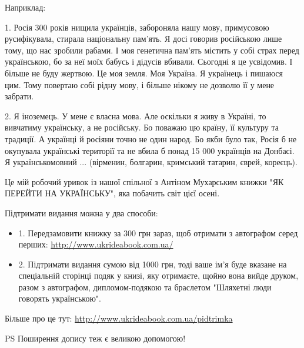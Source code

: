 Наприклад:

1. Росія 300 років нищила українців, забороняла нашу мову, примусовою
русифікувала, стирала національну пам’ять. Я досі говорив російською лише тому,
що нас зробили рабами. І моя генетична пам’ять містить у собі страх перед
українською, бо за неї моїх бабусь і дідусів вбивали. Сьогодні я це усвідомив.
І більше не буду жертвою. Це моя земля. Моя Україна. Я українець і пишаюся цим.
Тому повертаю собі рідну мову, і більше нікому не дозволю її у мене забрати.

2. Я іноземець. У мене є власна мова. Але оскільки я живу в Україні, то
вивчатиму українську, а не російську. Бо поважаю цю країну, її культуру та
традиції. А українці й росіяни точно не один народ. Бо якби було так, Росія б
не окупувала українські території та не вбила б понад 15 000 українців на
Донбасі. Я українськомовний ... (вірменин, болгарин, кримський татарин, єврей,
кореєць).

Це мій робочий уривок із нашої спільної з Антіном Мухарським книжки "ЯК ПЕРЕЙТИ
НА УКРАЇНСЬКУ", яка побачить світ цієї осені.

Підтримати видання можна у два способи:

\begin{itemize}
\item 1. Передзамовити книжку за 300 грн зараз, щоб отримати з автографом серед перших: \url{http://www.ukrideabook.com.ua/}
\item 2. Підтримати видання сумою від 1000 грн, тоді ваше ім'я буде вказане на
спеціальній сторінці подяк у книзі, яку отримаєте, щойно вона вийде друком,
разом з автографом, дипломом-подякою та браслетом "Шляхетні люди говорять
українською".
\end{itemize}

Більше про це тут: \url{http://www.ukrideabook.com.ua/pidtrimka}

PS Поширення допису теж є великою допомогою!

